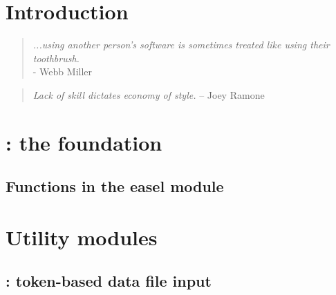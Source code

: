 \documentclass[10pt]{book}
\begin{document}


\newpage
\tableofcontents

\sloppy

\newpage
\chapter{Introduction}


\begin{quote}
 \emph{...using another person's software is sometimes treated like 
 using their toothbrush.}\\
\hspace*{1em}\hfill - Webb Miller \citep{Miller01}
\end{quote}

\vspace*{\fill}
\begin{quote}
\hspace*{1em}\hfill \emph{Lack of skill dictates economy of style.} \hspace{1em} -- Joey Ramone
\end{quote}     


\newpage
\chapter{: the foundation}

\section{Functions in the easel module}

\vspace*{\fill}


\newpage
\chapter{Utility modules}

\newpage
\section{: token-based data file input}

\end{document}
